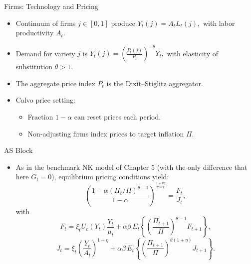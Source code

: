 \documentclass[11pt,aspectratio=169]{beamer}
\begin{document}
\begin{frame}{Firms: Technology and Pricing}
  \begin{itemize}
    \item Continuum of firms $j \in [0,1]$ produce $Y_t(j) = A_t L_t(j),$ with labor productivity $A_t$.
    \item Demand for variety $j$ is $Y_t(j)
      = \left(\frac{P_t(j)}{P_t}\right)^{-\theta} Y_t,$ with elasticity of substitution $\theta>1$.
    \item The aggregate price index $P_t$ is the Dixit--Stiglitz aggregator.
    \item Calvo price setting:
    \begin{itemize}
      \item Fraction $1-\alpha$ can reset prices each period.
      \item Non-adjusting firms index prices to target inflation $\Pi$.
    \end{itemize}
  \end{itemize}
\end{frame}

\begin{frame}{AS Block}
  \begin{itemize}
    \item As in the benchmark NK model of Chapter 5 (with the only difference that here $G_t=0$), equilibrium pricing conditions yield:
    $$\left(
        \frac{1-\alpha(\Pi_t/\Pi)^{\theta-1}}
             {1-\alpha}
      \right)^{\frac{1+\theta\eta}{\theta-1}}
      = \frac{F_t}{J_t},$$
    with
    $$ F_t
      = \xi_t U_c(Y_t)\frac{Y_t}{\mu_t}
        + \alpha\beta\,E_t\left\{
           \left(\frac{\Pi_{t+1}}{\Pi}\right)^{\theta-1} F_{t+1}
        \right\},$$
$$  J_t
      = \xi_t\left(\frac{Y_t}{A_t}\right)^{1+\eta}
        + \alpha\beta\,E_t\left\{
           \left(\frac{\Pi_{t+1}}{\Pi}\right)^{\theta(1+\eta)} J_{t+1}
        \right\}.$$
  \end{itemize}
\end{frame}
\end{document}
